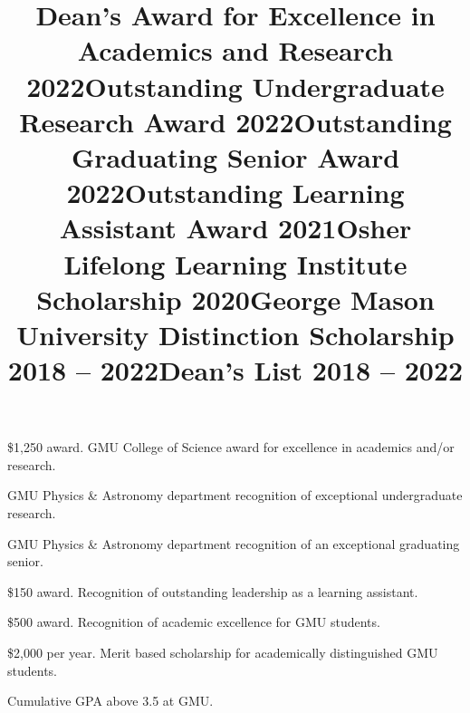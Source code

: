 \documentclass[marg, centered]{res}
\begin{document}
\begin{resume}
\vspace{-0.3cm}
\title{\textbf{Dean's Award for Excellence in Academics and Research} \hfill {\textbf{2022}}}
\begin{position}
\$1,250 award.  GMU College of Science award for excellence in academics and/or research.
\end{position}

\vspace{-0.3cm}
\title{\textbf{Outstanding Undergraduate Research Award} \hfill \textbf{2022}}
\begin{position}
GMU Physics \& Astronomy department recognition of exceptional undergraduate research.
\end{position}

\vspace{-0.3cm}
\title{\textbf{Outstanding Graduating Senior Award} \hfill \textbf{2022}}
\begin{position}
GMU Physics \& Astronomy department recognition of an exceptional graduating senior.
\end{position}

\vspace{-0.3cm}
\title{\textbf{Outstanding Learning Assistant Award} \hfill \textbf{2021}}
\begin{position}
\$150 award.  Recognition of outstanding leadership as a learning assistant.
\end{position}

\vspace{-0.3cm}
\title{\textbf{Osher Lifelong Learning Institute Scholarship} \hfill \textbf{2020}}
\begin{position}
\$500 award.  Recognition of academic excellence for GMU students.
\end{position}

\vspace{-0.3cm}
\title{\textbf{George Mason University Distinction Scholarship} \hfill \textbf{2018 -- 2022}}
\begin{position}
\$2,000 per year. Merit based scholarship for academically distinguished GMU students.
\end{position}

\vspace{-0.3cm}
\title{\textbf{Dean's List} \hfill \textbf{2018 -- 2022}}
\begin{position}
Cumulative GPA above 3.5 at GMU.
\end{position}


\end{resume}
\end{document}
